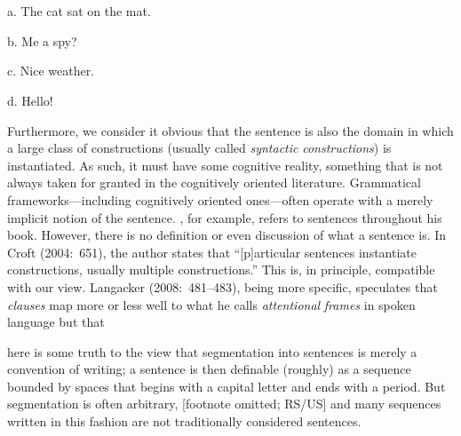 \begin{styleMoutonExample}
\ea%
    \label{ex:key:8}
    \gll\\
        \\
    \glt
    \z

          a.  The cat sat on the mat.
\end{styleMoutonExample}

\begin{styleMoutonExampleAlpha}
b.  Me a spy?
\end{styleMoutonExampleAlpha}

\begin{styleMoutonExampleAlpha}
c.  Nice weather.
\end{styleMoutonExampleAlpha}

\begin{styleMoutonExampleAlpha}
d.  Hello!
\end{styleMoutonExampleAlpha}

\begin{styleMoutonTextAfterExample}
Furthermore, we consider it obvious that the sentence is also the domain in which a large class of constructions (usually called \textit{syntactic} \textit{constructions}) is instantiated. As such, it must have some cognitive reality, something that is not always taken for granted in the cognitively oriented literature. Grammatical frameworks—including cognitively oriented ones—often operate with a merely implicit notion of the sentence. \citet{Croft2001}, for example, refers to sentences throughout his book. However, there is no definition or even discussion of what a sentence is. In Croft (2004:~651), the author states that “[p]articular sentences instantiate constructions, usually multiple constructions.” This is, in principle, compatible with our view. Langacker (2008:~481–483), being more specific, speculates that \textit{clauses} map more or less well to what he calls \textit{attentional} \textit{frames} in spoken language but that
\end{styleMoutonTextAfterExample}

\begin{styleMoutonQuote}
[t]here is some truth to the view that segmentation into sentences is merely a convention of writing; a sentence is then definable (roughly) as a sequence bounded by spaces that begins with a capital letter and ends with a period. But segmentation is often arbitrary, [footnote omitted; RS/US] and many sequences written in this fashion are not traditionally considered sentences.
\end{styleMoutonQuote}

